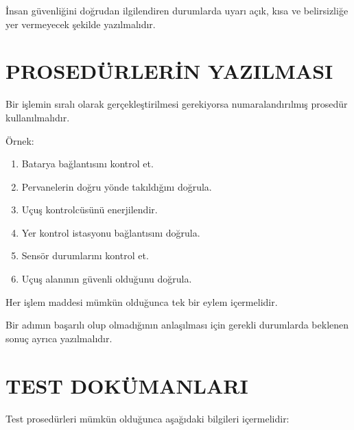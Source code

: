 \documentclass[11pt,a4paper]{article}
\begin{document}
İnsan güvenliğini doğrudan ilgilendiren durumlarda uyarı açık,
kısa ve belirsizliğe yer vermeyecek şekilde yazılmalıdır.


\newpage

\section{PROSEDÜRLERİN YAZILMASI}

Bir işlemin sıralı olarak gerçekleştirilmesi gerekiyorsa
numaralandırılmış prosedür kullanılmalıdır.

Örnek:

\begin{enumerate}

    \item Batarya bağlantısını kontrol et.

    \item Pervanelerin doğru yönde takıldığını doğrula.

    \item Uçuş kontrolcüsünü enerjilendir.

    \item Yer kontrol istasyonu bağlantısını doğrula.

    \item Sensör durumlarını kontrol et.

    \item Uçuş alanının güvenli olduğunu doğrula.

\end{enumerate}

Her işlem maddesi mümkün olduğunca tek bir eylem içermelidir.

Bir adımın başarılı olup olmadığının anlaşılması için gerekli durumlarda
beklenen sonuç ayrıca yazılmalıdır.


\newpage

\section{TEST DOKÜMANLARI}

Test prosedürleri mümkün olduğunca aşağıdaki bilgileri içermelidir:
\end{document}
